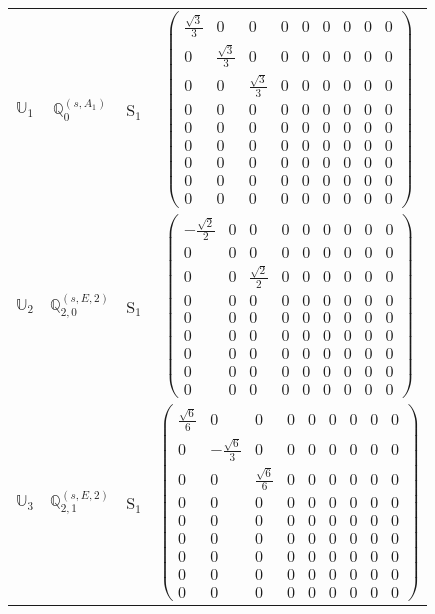 \documentclass[fleqn,10pt,landscape]{article}
\begin{document}
\begin{itemize}
\begin{center}
\begin{longtable}{c|c|c|c}
$ \mathbb{U}_{1} $ & $\mathbb{Q}_{0}^{(s,A_{1})}$ & S$_{1}$ & $\begin{pmatrix} \frac{\sqrt{3}}{3} & 0 & 0 & 0 & 0 & 0 & 0 & 0 & 0 \\ 0 & \frac{\sqrt{3}}{3} & 0 & 0 & 0 & 0 & 0 & 0 & 0 \\ 0 & 0 & \frac{\sqrt{3}}{3} & 0 & 0 & 0 & 0 & 0 & 0 \\ 0 & 0 & 0 & 0 & 0 & 0 & 0 & 0 & 0 \\ 0 & 0 & 0 & 0 & 0 & 0 & 0 & 0 & 0 \\ 0 & 0 & 0 & 0 & 0 & 0 & 0 & 0 & 0 \\ 0 & 0 & 0 & 0 & 0 & 0 & 0 & 0 & 0 \\ 0 & 0 & 0 & 0 & 0 & 0 & 0 & 0 & 0 \\ 0 & 0 & 0 & 0 & 0 & 0 & 0 & 0 & 0 \end{pmatrix}$ \\
$ \mathbb{U}_{2} $ & $\mathbb{Q}_{2,0}^{(s,E,2)}$ & S$_{1}$ & $\begin{pmatrix} - \frac{\sqrt{2}}{2} & 0 & 0 & 0 & 0 & 0 & 0 & 0 & 0 \\ 0 & 0 & 0 & 0 & 0 & 0 & 0 & 0 & 0 \\ 0 & 0 & \frac{\sqrt{2}}{2} & 0 & 0 & 0 & 0 & 0 & 0 \\ 0 & 0 & 0 & 0 & 0 & 0 & 0 & 0 & 0 \\ 0 & 0 & 0 & 0 & 0 & 0 & 0 & 0 & 0 \\ 0 & 0 & 0 & 0 & 0 & 0 & 0 & 0 & 0 \\ 0 & 0 & 0 & 0 & 0 & 0 & 0 & 0 & 0 \\ 0 & 0 & 0 & 0 & 0 & 0 & 0 & 0 & 0 \\ 0 & 0 & 0 & 0 & 0 & 0 & 0 & 0 & 0 \end{pmatrix}$ \\
$ \mathbb{U}_{3} $ & $\mathbb{Q}_{2,1}^{(s,E,2)}$ & S$_{1}$ & $\begin{pmatrix} \frac{\sqrt{6}}{6} & 0 & 0 & 0 & 0 & 0 & 0 & 0 & 0 \\ 0 & - \frac{\sqrt{6}}{3} & 0 & 0 & 0 & 0 & 0 & 0 & 0 \\ 0 & 0 & \frac{\sqrt{6}}{6} & 0 & 0 & 0 & 0 & 0 & 0 \\ 0 & 0 & 0 & 0 & 0 & 0 & 0 & 0 & 0 \\ 0 & 0 & 0 & 0 & 0 & 0 & 0 & 0 & 0 \\ 0 & 0 & 0 & 0 & 0 & 0 & 0 & 0 & 0 \\ 0 & 0 & 0 & 0 & 0 & 0 & 0 & 0 & 0 \\ 0 & 0 & 0 & 0 & 0 & 0 & 0 & 0 & 0 \\ 0 & 0 & 0 & 0 & 0 & 0 & 0 & 0 & 0 \end{pmatrix}$ \\ \hline

\end{longtable}
\end{center}
\end{itemize}
\end{document}
